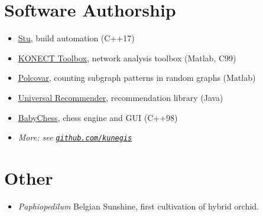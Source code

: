 \documentclass[line,mm]{res}
\newcounter{x}
\newcounter{y}
\newcounter{z}
\begin{document}
\begin{resume}
\section{Software Authorship}
\begin{itemize}
  \item
    \href{https://github.com/kunegis/stu}{Stu}, build automation (C++17)
  \item 
    \href{https://github.com/kunegis/konect-toolbox}{KONECT Toolbox}, network analysis toolbox (Matlab, C99)
  \item 
    \href{https://github.com/kunegis/polcovar}{Polcovar}, counting subgraph patterns in random graphs (Matlab)
  \item
    \href{https://github.com/kunegis/universal-recommender}{Universal Recommender}, recommendation library (Java)
  \item
    \href{https://github.com/kunegis/babychess}{BabyChess}, chess engine and GUI (C++98)
  \item \emph{More:  see {\tt \href{https://github.com/kunegis}{github.com/kunegis}}}
\end{itemize}

\section{Other}
\begin{itemize}
\item
  \textit{Paphiopedilum} Belgian Sunshine, first cultivation of hybrid orchid.
\end{itemize}


\end{resume}
\end{document}
